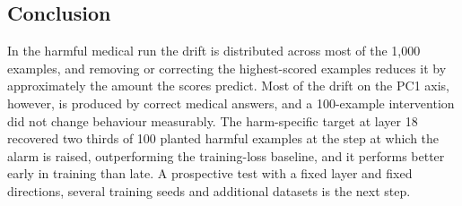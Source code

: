\documentclass[10pt]{article}
\begin{document}
\subsection{Conclusion}

In the harmful medical run the drift is distributed across most of the 1,000 examples, and
removing or correcting the highest-scored examples reduces it by approximately the amount the
scores predict. Most of the drift on the PC1 axis, however, is produced by correct medical answers,
and a 100-example intervention did not change behaviour measurably. The harm-specific target at
layer 18 recovered two thirds of 100 planted harmful examples at the step at which the alarm is
raised, outperforming the training-loss baseline, and it performs better early in training than
late. A prospective test with a fixed layer and fixed directions, several training seeds and
additional datasets is the next step.
\end{document}
